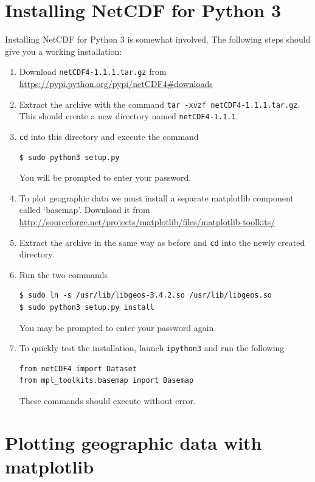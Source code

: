 \documentclass[a4paper,twoside,titlepage]{memoir}
\newcommand{\shellcmd}{\texttt}
\begin{document}
\section{Installing NetCDF for Python 3}
Installing NetCDF for Python 3 is somewhat involved.  The following steps should give you a working installation:
\begin{enumerate}
	\item Download \shellcmd{netCDF4-1.1.1.tar.gz} from \url{https://pypi.python.org/pypi/netCDF4#downloads}
	\item Extract the archive with the command \shellcmd{tar -xvzf netCDF4-1.1.1.tar.gz}.  This should create a new directory named \shellcmd{netCDF4-1.1.1}.
	\item \shellcmd{cd} into this directory and execute the command 
\begin{verbatim}
$ sudo python3 setup.py
\end{verbatim}
You will be prompted to enter your password.
	\item To plot geographic data we must install a separate matplotlib component called `basemap'.  Download it from \url{http://sourceforge.net/projects/matplotlib/files/matplotlib-toolkits/}
	\item Extract the archive in the same way as before and \shellcmd{cd} into the newly created directory.
	\item Run the two commands
\begin{verbatim}
$ sudo ln -s /usr/lib/libgeos-3.4.2.so /usr/lib/libgeos.so
$ sudo python3 setup.py install
\end{verbatim}
You may be prompted to enter your password again.
	\item To quickly test the installation, launch \shellcmd{ipython3} and run the following
\begin{verbatim}
from netCDF4 import Dataset
from mpl_toolkits.basemap import Basemap
\end{verbatim}
These commands should execute without error.
\end{enumerate}

\section{Plotting geographic data with matplotlib}
\end{document}

